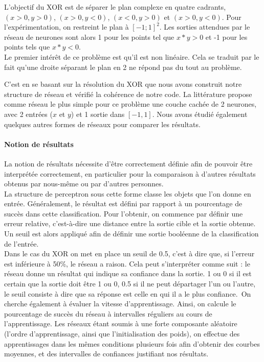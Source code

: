 L'objectif du XOR est de séparer le plan complexe en quatre cadrants, $(x >0, y > 0)$, $ (x>0, y<0)$, $ (x<0, y>0)$ et $ (x>0, y<0) $. Pour l'expérimentation, on restreint le plan à $[-1;1]^2$. Les sorties attendues par le réseau de neurones sont alors 1 pour les points tel que $x*y > 0 $ et -1 pour les points tels que $x*y<0$. \\
Le premier intérêt de ce problème est qu'il est non linéaire. Cela se traduit par le fait qu'une droite séparant le plan en 2 ne répond pas du tout au problème.

C'est en se basant sur la résolution du XOR que nous avons construit notre structure de réseau et vérifié la cohérence de notre code. La littérature propose comme réseau le plus simple pour ce problème une couche cachée de 2 neurones, avec 2 entrées ($x$ et $y$) et 1 sortie dans $[-1, 1]$. Nous avons étudié également quelques autres formes de réseaux pour comparer les résultats.

\paragraph{Notion de résultats} %
\label{par:notion_de_resultats}
La notion de résultats nécessite d'être correctement définie afin de pouvoir être interprétée correctement, en particulier pour la comparaison à d'autres résultats obtenus par nous-même ou par d'autres personnes. \\
La structure de perceptron sous cette forme classe les objets que l'on donne en entrée. Généralement, le résultat est défini par rapport à un pourcentage de succès dans cette classification. Pour l'obtenir, on commence par définir une erreur relative, c'est-à-dire une distance entre la sortie cible et la sortie obtenue. Un seuil est alors appliqué afin de définir une sortie booléenne de la classification de l'entrée.\\
Dans le cas du XOR on met en place un seuil de 0.5, c'est à dire que, si l'erreur est inférieure à 50\%, le réseau a raison. Cela peut s’interpréter comme suit : le réseau donne un résultat qui indique sa confiance dans la sortie. 1 ou 0 si il est certain que la sortie doit être 1 ou 0, 0.5 si il ne peut départager l'un ou l'autre, le seuil consiste à dire que sa réponse est celle en qui il a le plus confiance.\
On cherche également à évaluer la vitesse d'apprentissage. Ainsi, on calcule le pourcentage de succès du réseau à intervalles réguliers au cours de l'apprentissage. Les réseaux étant soumis à une forte composante aléatoire (l'ordre d'apprentissage, ainsi que l'initialisation des poids), on effectue des apprentissages dans les mêmes conditions plusieurs fois afin d'obtenir des courbes moyennes, et des intervalles de confiances justifiant nos résultats.

